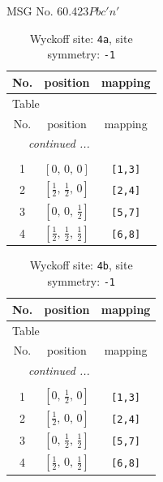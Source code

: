 \documentclass[fleqn,8pt]{jsarticle}
\begin{document}
\setcounter{MaxMatrixCols}{32}

\renewcommand{\tablename}{Table~}
\renewcommand{\figurename}{Figure~}
\begin{center}
\LARGE
MSG No. 60.423\quad$Pbc'n'$
\end{center}
\renewcommand{\arraystretch}{1.2}
\begin{longtable}{ccc}
\caption{Wyckoff site: {\tt 4a}, site symmetry: {\tt -1}}
 \\
 \hline \hline
No. & position & mapping \\ \hline \endfirsthead

\multicolumn{2}{l}{\tablename\ \thetable{}} \\
 \hline \hline
No. & position & mapping \\ \hline \endhead

 \hline \hline
\multicolumn{2}{r}{\footnotesize\it continued ...} \\ \endfoot

 \hline \hline
\multicolumn{2}{r}{} \\ \endlastfoot

1 & $\left[ 0,\, 0,\, 0 \right]$ & {\tt [1,3]} \\ \hline
2 & $\left[ \frac{1}{2},\, \frac{1}{2},\, 0 \right]$ & {\tt [2,4]} \\ \hline
3 & $\left[ 0,\, 0,\, \frac{1}{2} \right]$ & {\tt [5,7]} \\ \hline
4 & $\left[ \frac{1}{2},\, \frac{1}{2},\, \frac{1}{2} \right]$ & {\tt [6,8]} \\
\end{longtable}
\renewcommand{\arraystretch}{1.2}
\begin{longtable}{ccc}
\caption{Wyckoff site: {\tt 4b}, site symmetry: {\tt -1}}
 \\
 \hline \hline
No. & position & mapping \\ \hline \endfirsthead

\multicolumn{2}{l}{\tablename\ \thetable{}} \\
 \hline \hline
No. & position & mapping \\ \hline \endhead

 \hline \hline
\multicolumn{2}{r}{\footnotesize\it continued ...} \\ \endfoot

 \hline \hline
\multicolumn{2}{r}{} \\ \endlastfoot

1 & $\left[ 0,\, \frac{1}{2},\, 0 \right]$ & {\tt [1,3]} \\ \hline
2 & $\left[ \frac{1}{2},\, 0,\, 0 \right]$ & {\tt [2,4]} \\ \hline
3 & $\left[ 0,\, \frac{1}{2},\, \frac{1}{2} \right]$ & {\tt [5,7]} \\ \hline
4 & $\left[ \frac{1}{2},\, 0,\, \frac{1}{2} \right]$ & {\tt [6,8]} \\
\end{longtable}
\end{document}
